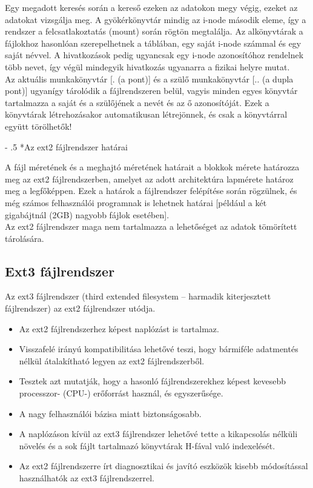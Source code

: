 \documentclass[tikz,12pt,margin=0px]{article}
\makeatletter
\renewcommand\paragraph{%
	\@startsection{paragraph}{4}{0mm}%
	{-\baselineskip}%
	{.5\baselineskip}%
	{\normalfont\normalsize\bfseries}}
\makeatother
\begin{document}
    \noindent Egy megadott keresés során a kereső ezeken az adatokon megy végig, ezeket az adatokat vizsgálja meg. A gyökérkönyvtár mindig az i-node második eleme, így a rendszer a felcsatlakoztatás (mount) során rögtön megtalálja. Az alkönyvtárak a fájlokhoz hasonlóan szerepelhetnek a táblában, egy saját i-node számmal és egy saját névvel. A hivatkozások pedig ugyancsak egy i-node azonosítóhoz rendelnek több nevet, így végül mindegyik hivatkozás ugyanarra a fizikai helyre mutat.\\

    \noindent Az aktuális munkakönyvtár [. (a pont)] és a szülő munkakönyvtár [.. (a dupla pont)] ugyanígy tárolódik a fájlrendszeren belül, vagyis minden egyes könyvtár tartalmazza a saját és a szülőjének a nevét és az ő azonosítóját. Ezek a könyvtárak létrehozásakor automatikusan létrejönnek, és csak a könyvtárral együtt törölhetők!

    \paragraph*{Az ext2 fájlrendszer határai}

    \noindent A fájl méretének és a meghajtó méretének határait a blokkok mérete határozza meg az ext2 fájlrendszerben, amelyet az adott architektúra lapmérete határoz meg a legfőképpen. Ezek a határok a fájlrendszer felépítése során rögzülnek, és még számos felhasználói programnak is lehetnek határai [például a két gigabájtnál (2GB) nagyobb fájlok esetében].\\

    \noindent Az ext2 fájlrendszer maga nem tartalmazza a lehetőséget az adatok tömörített tárolására.

    \subsection*{Ext3 fájlrendszer}

    \noindent Az ext3 fájlrendszer (third extended filesystem – harmadik kiterjesztett fájlrendszer) az ext2 fájlrendszer utódja.

    \begin{itemize}[topsep=8pt,itemsep=4pt,partopsep=4pt, parsep=4pt]
        \item Az ext2 fájlrendszerhez képest naplózást is tartalmaz.
        \item Visszafelé irányú kompatibilitása lehetővé teszi, hogy bármiféle adatmentés nélkül átalakítható legyen az ext2 fájlrendszerből.
        \item Tesztek azt mutatják, hogy a hasonló fájlrendszerekhez képest kevesebb processzor- (CPU-) erőforrást használ, és egyszerűsége.
        \item A nagy felhasználói bázisa miatt biztonságosabb.
        \item A naplózáson kívül az ext3 fájlrendszer lehetővé tette a kikapcsolás nélküli növelés és a sok fájlt tartalmazó könyvtárak H-fával való indexelését.
        \item Az ext2 fájlrendszerre írt diagnosztikai és javító eszközök kisebb módosítással használhatók az ext3 fájlrendszerrel.
    \end{itemize}
\end{document}

